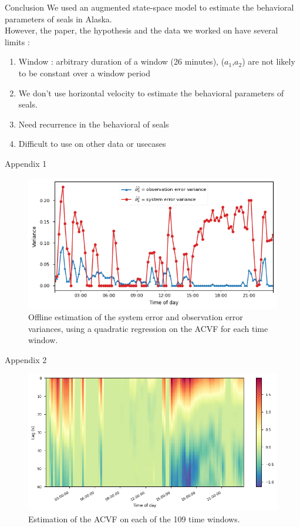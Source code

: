 \documentclass[dvipsnames, handout]{beamer}
\begin{document}
\begin{frame}{Conclusion}
We used an augmented state-space model to estimate the behavioral
parameters of seals in Alaska.
\newline
\\
However, the paper, the hypothesis and the data we worked on have several limits :

\begin{enumerate}
    \item Window : arbitrary duration of a window (26 minutes), ($a_1$,$a_2$) are not likely to be constant over a window period
    \item We don't use horizontal velocity to estimate the behavioral parameters of seals.
    \item Need recurrence in the behavioral of seals
    \item Difficult to use on other data or usecases
\end{enumerate}
\end{frame}
\begin{frame}{Appendix 1}
\begin{figure}[h]
    \centering
    \includegraphics[width=0.8\linewidth]{var_fig.png}
    \caption{Offline estimation of the system error and observation error variances, using a quadratic regression on the ACVF for each time window.}
\end{figure}
\end{frame}

\begin{frame}{Appendix 2}
\begin{figure}[h]
    \centering
    \includegraphics[width=0.8\linewidth]{acvf_fig.png}
    \caption{Estimation of the ACVF on each of the 109 time windows.}
    \label{fig:acvfs}
\end{figure}
\end{frame}
\end{document}
